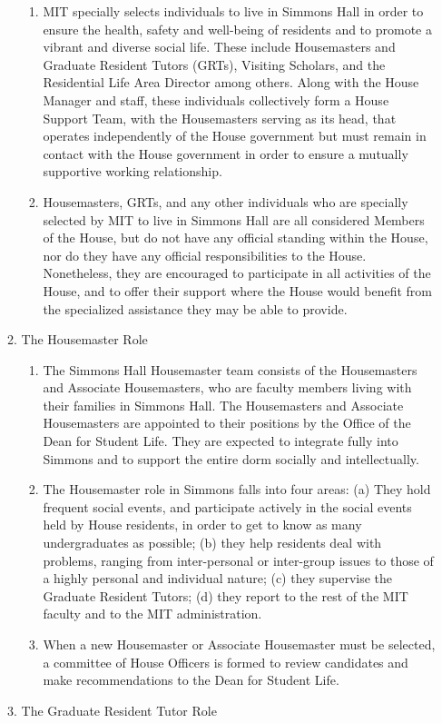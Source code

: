 \documentclass[letterpaper]{article}
\begin{document}
\begin{enumerate}
\begin{enumerate}
\begin{enumerate}
\item MIT specially selects individuals to live in Simmons Hall in order
to ensure the health, safety and well-being of residents and to promote
a vibrant and diverse social life. These include Housemasters and
Graduate Resident Tutors (GRTs), Visiting Scholars, and the Residential
Life Area Director among others. Along with the House Manager and
staff, these individuals collectively form a House Support Team, with
the Housemasters serving as its head, that operates independently of
the House government but must remain in contact with the House
government in order to ensure a mutually supportive working
relationship.
\item Housemasters, GRTs, and any other individuals who are specially
selected by MIT to live in Simmons Hall are all considered Members of
the House, but do not have any official standing within the House, nor
do they have any official responsibilities to the House. Nonetheless,
they are encouraged to participate in all activities of the House, and
to offer their support where the House would benefit from the
specialized assistance they may be able to provide.
\end{enumerate}
\item The Housemaster Role 

\begin{enumerate}
\item The Simmons Hall Housemaster team consists of the Housemasters and
Associate Housemasters, who are faculty members living with their
families in Simmons Hall. The Housemasters and Associate Housemasters
are appointed to their positions by the Office of the Dean for Student
Life. They are expected to integrate fully into Simmons and to support
the entire dorm socially and intellectually.
\item The Housemaster role in Simmons falls into four areas: (a) They
hold frequent social events, and participate actively in the social
events held by House residents, in order to get to know as many
undergraduates as possible; (b) they help residents deal with problems,
ranging from inter-personal or inter-group issues to those of a highly
personal and individual nature; (c) they supervise the Graduate
Resident Tutors; (d) they report to the rest of the MIT faculty and to
the MIT administration.
\item When a new Housemaster or Associate Housemaster must be selected,
a committee of House Officers is formed to review candidates and make
recommendations to the Dean for Student Life.
\end{enumerate}
\item The Graduate Resident Tutor Role 


\end{enumerate}
\end{enumerate}
\end{document}
